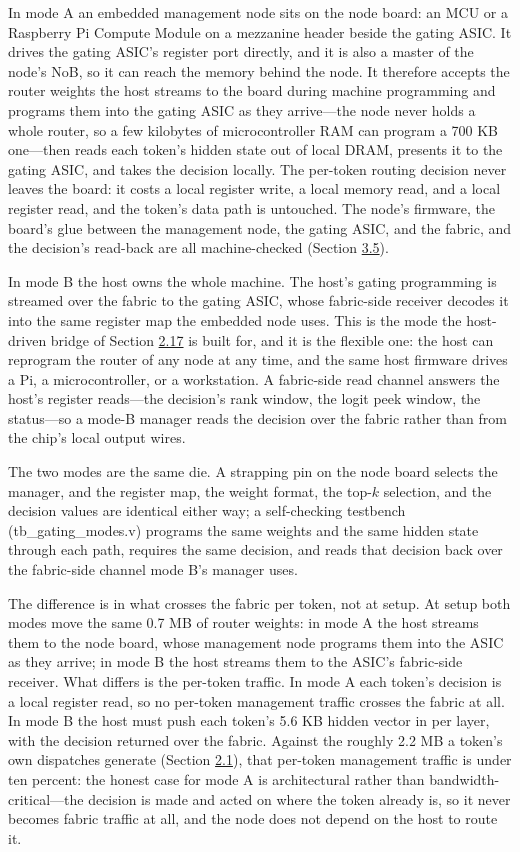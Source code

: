 \documentclass[10pt,twocolumn]{article}
\begin{document}
In mode A an embedded management node sits on the node board: an MCU or a Raspberry Pi Compute Module on a mezzanine header beside the gating ASIC. It drives the gating ASIC's register port directly, and it is also a master of the node's NoB, so it can reach the memory behind the node. It therefore accepts the router weights the host streams to the board during machine programming and programs them into the gating ASIC as they arrive---the node never holds a whole router, so a few kilobytes of microcontroller RAM can program a 700 KB one---then reads each token's hidden state out of local DRAM, presents it to the gating ASIC, and takes the decision locally. The per-token routing decision never leaves the board: it costs a local register write, a local memory read, and a local register read, and the token's data path is untouched. The node's firmware, the board's glue between the management node, the gating ASIC, and the fabric, and the decision's read-back are all machine-checked (Section \hyperref[sec:3.5]{3.5}).

In mode B the host owns the whole machine. The host's gating programming is streamed over the fabric to the gating ASIC, whose fabric-side receiver decodes it into the same register map the embedded node uses. This is the mode the host-driven bridge of Section \hyperref[sec:2.17]{2.17} is built for, and it is the flexible one: the host can reprogram the router of any node at any time, and the same host firmware drives a Pi, a microcontroller, or a workstation. A fabric-side read channel answers the host's register reads---the decision's rank window, the logit peek window, the status---so a mode-B manager reads the decision over the fabric rather than from the chip's local output wires.

The two modes are the same die. A strapping pin on the node board selects the manager, and the register map, the weight format, the top-$k$ selection, and the decision values are identical either way; a self-checking testbench (tb\_gating\_modes.v) programs the same weights and the same hidden state through each path, requires the same decision, and reads that decision back over the fabric-side channel mode B's manager uses.

The difference is in what crosses the fabric per token, not at setup. At setup both modes move the same 0.7 MB of router weights: in mode A the host streams them to the node board, whose management node programs them into the ASIC as they arrive; in mode B the host streams them to the ASIC's fabric-side receiver. What differs is the per-token traffic. In mode A each token's decision is a local register read, so no per-token management traffic crosses the fabric at all. In mode B the host must push each token's 5.6 KB hidden vector in per layer, with the decision returned over the fabric. Against the roughly 2.2 MB a token's own dispatches generate (Section \hyperref[sec:2.1]{2.1}), that per-token management traffic is under ten percent: the honest case for mode A is architectural rather than bandwidth-critical---the decision is made and acted on where the token already is, so it never becomes fabric traffic at all, and the node does not depend on the host to route it.
\end{document}
